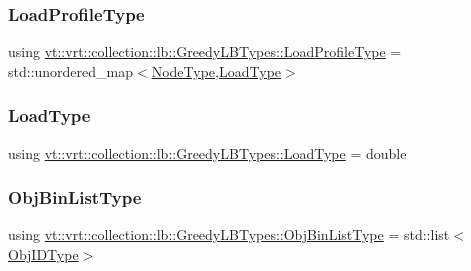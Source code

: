 \subsubsection{\texorpdfstring{Load\+Profile\+Type}{LoadProfileType}}
{\footnotesize\ttfamily using \hyperlink{structvt_1_1vrt_1_1collection_1_1lb_1_1_greedy_l_b_types_a8af324cd88e83727178631e4d1478932}{vt\+::vrt\+::collection\+::lb\+::\+Greedy\+L\+B\+Types\+::\+Load\+Profile\+Type} =  std\+::unordered\+\_\+map$<$\hyperlink{namespacevt_a866da9d0efc19c0a1ce79e9e492f47e2}{Node\+Type},\hyperlink{structvt_1_1vrt_1_1collection_1_1lb_1_1_greedy_l_b_types_a9fe8829bc0c92e88ddf9d149233a54f4}{Load\+Type}$>$}

\mbox{\label{structvt_1_1vrt_1_1collection_1_1lb_1_1_greedy_l_b_types_a9fe8829bc0c92e88ddf9d149233a54f4}} 
\subsubsection{\texorpdfstring{Load\+Type}{LoadType}}
{\footnotesize\ttfamily using \hyperlink{structvt_1_1vrt_1_1collection_1_1lb_1_1_greedy_l_b_types_a9fe8829bc0c92e88ddf9d149233a54f4}{vt\+::vrt\+::collection\+::lb\+::\+Greedy\+L\+B\+Types\+::\+Load\+Type} =  double}

\mbox{\label{structvt_1_1vrt_1_1collection_1_1lb_1_1_greedy_l_b_types_a5f1f5da7ec80da0de64a9d91624c396b}} 
\subsubsection{\texorpdfstring{Obj\+Bin\+List\+Type}{ObjBinListType}}
{\footnotesize\ttfamily using \hyperlink{structvt_1_1vrt_1_1collection_1_1lb_1_1_greedy_l_b_types_a5f1f5da7ec80da0de64a9d91624c396b}{vt\+::vrt\+::collection\+::lb\+::\+Greedy\+L\+B\+Types\+::\+Obj\+Bin\+List\+Type} =  std\+::list$<$\hyperlink{structvt_1_1vrt_1_1collection_1_1lb_1_1_greedy_l_b_types_a201f3d97240fe881e1ed6c0d2cfde262}{Obj\+I\+D\+Type}$>$}

